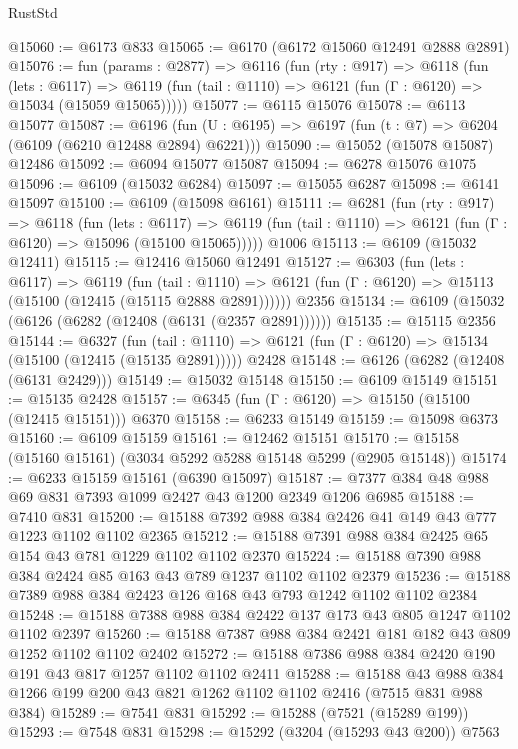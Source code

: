 \begin{lexlean}{RustStd}
\begin{coremodule}
@15060 := @6173 @833
@15065 := @6170 (@6172 @15060 @12491 @2888 @2891)
@15076 := fun (params : @2877) =>
  @6116
    (fun (rty : @917) =>
    @6118
      (fun (lets : @6117) =>
      @6119 (fun (tail : @1110) => @6121 (fun (Γ : @6120) => @15034 (@15059 @15065)))))
@15077 := @6115 @15076
@15078 := @6113 @15077
@15087 := @6196
    (fun (U : @6195) => @6197 (fun (t : @7) => @6204 (@6109 (@6210 @12488 @2894) @6221)))
@15090 := @15052 (@15078 @15087) @12486
@15092 := @6094 @15077 @15087
@15094 := @6278 @15076 @1075
@15096 := @6109 (@15032 @6284)
@15097 := @15055 @6287
@15098 := @6141 @15097
@15100 := @6109 (@15098 @6161)
@15111 := @6281
    (fun (rty : @917) =>
    @6118
      (fun (lets : @6117) =>
      @6119 (fun (tail : @1110) => @6121 (fun (Γ : @6120) => @15096 (@15100 @15065)))))
    @1006
@15113 := @6109 (@15032 @12411)
@15115 := @12416 @15060 @12491
@15127 := @6303
    (fun (lets : @6117) =>
    @6119
      (fun (tail : @1110) =>
      @6121 (fun (Γ : @6120) => @15113 (@15100 (@12415 (@15115 @2888 @2891))))))
    @2356
@15134 := @6109 (@15032 (@6126 (@6282 (@12408 (@6131 (@2357 @2891))))))
@15135 := @15115 @2356
@15144 := @6327
    (fun (tail : @1110) => @6121 (fun (Γ : @6120) => @15134 (@15100 (@12415 (@15135 @2891)))))
    @2428
@15148 := @6126 (@6282 (@12408 (@6131 @2429)))
@15149 := @15032 @15148
@15150 := @6109 @15149
@15151 := @15135 @2428
@15157 := @6345 (fun (Γ : @6120) => @15150 (@15100 (@12415 @15151))) @6370
@15158 := @6233 @15149
@15159 := @15098 @6373
@15160 := @6109 @15159
@15161 := @12462 @15151
@15170 := @15158 (@15160 @15161) (@3034 @5292 @5288 @15148 @5299 (@2905 @15148))
@15174 := @6233 @15159 @15161 (@6390 @15097)
@15187 := @7377 @384 @48 @988 @69 @831 @7393 @1099 @2427 @43 @1200 @2349 @1206 @6985
@15188 := @7410 @831
@15200 := @15188 @7392 @988 @384 @2426 @41 @149 @43 @777 @1223 @1102 @1102 @2365
@15212 := @15188 @7391 @988 @384 @2425 @65 @154 @43 @781 @1229 @1102 @1102 @2370
@15224 := @15188 @7390 @988 @384 @2424 @85 @163 @43 @789 @1237 @1102 @1102 @2379
@15236 := @15188 @7389 @988 @384 @2423 @126 @168 @43 @793 @1242 @1102 @1102 @2384
@15248 := @15188 @7388 @988 @384 @2422 @137 @173 @43 @805 @1247 @1102 @1102 @2397
@15260 := @15188 @7387 @988 @384 @2421 @181 @182 @43 @809 @1252 @1102 @1102 @2402
@15272 := @15188 @7386 @988 @384 @2420 @190 @191 @43 @817 @1257 @1102 @1102 @2411
@15288 := @15188
    @43
    @988
    @384
    @1266
    @199
    @200
    @43
    @821
    @1262
    @1102
    @1102
    @2416
    (@7515 @831 @988 @384)
@15289 := @7541 @831
@15292 := @15288 (@7521 (@15289 @199))
@15293 := @7548 @831
@15298 := @15292 (@3204 (@15293 @43 @200)) @7563

\end{coremodule}
\end{lexlean}
